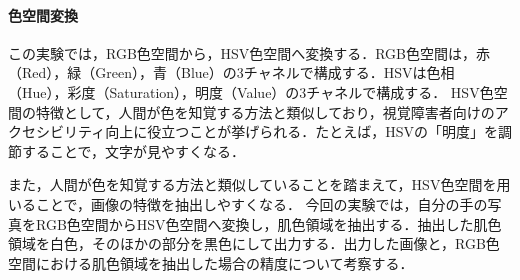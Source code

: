 \paragraph{色空間変換}この実験では，RGB色空間から，HSV色空間へ変換する．RGB色空間は，赤（Red），緑（Green），青（Blue）の3チャネルで構成する．HSVは色相（Hue），彩度（Saturation），明度（Value）の3チャネルで構成する．
HSV色空間の特徴として，人間が色を知覚する方法と類似しており，視覚障害者向けのアクセシビリティ向上に役立つことが挙げられる．たとえば，HSVの「明度」を調節することで，文字が見やすくなる\cite[p.97\ -\ p.98]{画像処理}．\par
また，人間が色を知覚する方法と類似していることを踏まえて，HSV色空間を用いることで，画像の特徴を抽出しやすくなる．
今回の実験では，自分の手の写真をRGB色空間からHSV色空間へ変換し，肌色領域を抽出する．抽出した肌色領域を白色，そのほかの部分を黒色にして出力する．出力した画像と，RGB色空間における肌色領域を抽出した場合の精度について考察する．